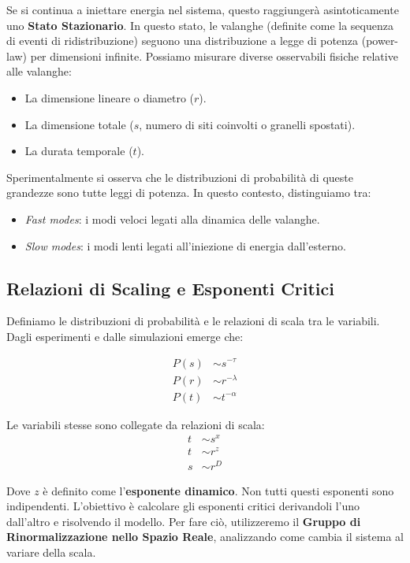 Se si continua a iniettare energia nel sistema, questo raggiungerà asintoticamente uno \textbf{Stato Stazionario}. In questo stato, le valanghe (definite come la sequenza di eventi di ridistribuzione) seguono una distribuzione a legge di potenza (power-law) per dimensioni infinite. Possiamo misurare diverse osservabili fisiche relative alle valanghe:
\begin{itemize}
    \item La dimensione lineare o diametro ($r$).
    \item La dimensione totale ($s$, numero di siti coinvolti o granelli spostati).
    \item La durata temporale ($t$).
\end{itemize}
Sperimentalmente si osserva che le distribuzioni di probabilità di queste grandezze sono tutte leggi di potenza.
In questo contesto, distinguiamo tra:
\begin{itemize}
    \item \textit{Fast modes}: i modi veloci legati alla dinamica delle valanghe.
    \item \textit{Slow modes}: i modi lenti legati all'iniezione di energia dall'esterno.
\end{itemize}

\subsection{Relazioni di Scaling e Esponenti Critici}

Definiamo le distribuzioni di probabilità e le relazioni di scala tra le variabili. Dagli esperimenti e dalle simulazioni emerge che:

\begin{align}
    P(s) &\sim s^{-\tau} \label{eq:Ps} \\
    P(r) &\sim r^{-\lambda} \label{eq:Pr} \\
    P(t) &\sim t^{-\alpha} \label{eq:Pt}
\end{align}

Le variabili stesse sono collegate da relazioni di scala:
\begin{align}
    t &\sim s^x \label{eq:t_s} \\
    t &\sim r^z \label{eq:t_r} \\
    s &\sim r^D \label{eq:s_r}
\end{align}

Dove $z$ è definito come l'\textbf{esponente dinamico}.
Non tutti questi esponenti sono indipendenti. L'obiettivo è calcolare gli esponenti critici derivandoli l'uno dall'altro e risolvendo il modello. Per fare ciò, utilizzeremo il \textbf{Gruppo di Rinormalizzazione nello Spazio Reale}, analizzando come cambia il sistema al variare della scala.

